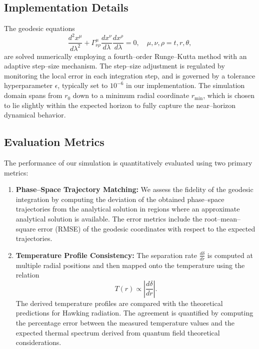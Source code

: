 \documentclass{article}\usepackage[utf8]{inputenc} %
\begin{document}
\subsection{Implementation Details}
The geodesic equations
\begin{equation}
\frac{d^{2}x^{\mu}}{d\lambda^{2}}+\Gamma^{\mu}_{\nu\rho}\frac{dx^{\nu}}{d\lambda}\frac{dx^{\rho}}{d\lambda}=0, \quad \mu,\nu,\rho=t, r, \theta,
\end{equation}
are solved numerically employing a fourth--order Runge--Kutta method with an adaptive step--size mechanism. The step--size adjustment is regulated by monitoring the local error in each integration step, and is governed by a tolerance hyperparameter $\epsilon$, typically set to $10^{-6}$ in our implementation. The simulation domain spans from $r_{0}$ down to a minimum radial coordinate $r_{\mathrm{min}}$, which is chosen to lie slightly within the expected horizon to fully capture the near--horizon dynamical behavior.

\subsection{Evaluation Metrics}
The performance of our simulation is quantitatively evaluated using two primary metrics:
\begin{enumerate}
    \item \textbf{Phase--Space Trajectory Matching:} We assess the fidelity of the geodesic integration by computing the deviation of the obtained phase--space trajectories from the analytical solution in regions where an approximate analytical solution is available. The error metrics include the root--mean--square error (RMSE) of the geodesic coordinates with respect to the expected trajectories.
    \item \textbf{Temperature Profile Consistency:} The separation rate $\frac{d\delta}{dr}$ is computed at multiple radial positions and then mapped onto the temperature using the relation
    \begin{equation}
    T(r) \propto \left| \frac{d\delta}{dr}\right|. 
    \end{equation}
    The derived temperature profiles are compared with the theoretical predictions for Hawking radiation. The agreement is quantified by computing the percentage error between the measured temperature values and the expected thermal spectrum derived from quantum field theoretical considerations.
\end{enumerate}
\end{document}
